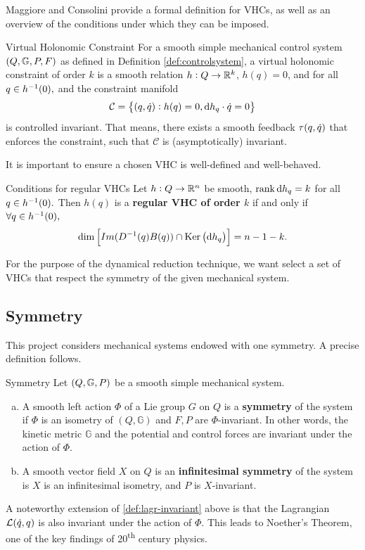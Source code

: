 \documentclass[main.tex]{subfiles}
\begin{document}
Maggiore and Consolini provide a formal definition for VHCs, as well as an overview of the conditions under which they can be imposed\cite{maggiore2012virtual}.

\begin{boxdef}{Virtual Holonomic Constraint \cite{maggiore2012virtual}}
For a smooth simple mechanical control system $\del{Q,\mbbg,P,F}$ as defined in Definition \ref{def:controlsystem}, a virtual holonomic constraint of order $k$ is a smooth relation $h:Q\to\mathbb{R}^k$,
$h(q)={0}$, and for all $q\in h^{-1}(0),$ and the constraint manifold
\begin{align}
    \mathcal{C}=\cbr{(q,\qd):h(q)=0,\dd h_q\cdot\qd=0}
\end{align}
is controlled invariant. That means, there exists a smooth feedback $\tau(q,\dot q)$ that enforces the constraint, such that $\mathcal{C}$ is (asymptotically) invariant.
\end{boxdef}
It is important to ensure a chosen VHC is well-defined and well-behaved.
\begin{boxthm}{Conditions for regular VHCs \cite{maggiore2012virtual}}
Let $h:Q\to\mathbb{R}^n$ be smooth, $\rank \dd h_q=k$ for all $q\in h^{-1}(0).$ Then $h(q)$ is a \textbf{regular VHC of order $k$} if and only if $\forall q\in h^{-1}(0),$
\begin{align}
     \dim\sbr{Im(D\inv(q)B(q))\cap \Ker{\dhq}}=n-1-k.
\end{align}
\end{boxthm}\label{thm:regularvhc}
For the purpose of the dynamical reduction technique, we want select a set of VHCs that respect the symmetry of the given mechanical system. 

\subsection{Symmetry}
This project considers mechanical systems endowed with one symmetry. A precise definition follows.
\begin{boxdef}{Symmetry 
\cite{bullo2019geometric}%
}
Let $\del{Q,\mbbg,P}$ be a smooth simple mechanical system. \begin{enumerate}[(a)]
    \item\label{def:lagr-invariant} A smooth left action $\Phi$ of a Lie group $G$ on $Q$ is a \textbf{symmetry} of the system if $\Phi$ is an isometry of $(Q,\mathbb{G})$ and $F,P$ are $\Phi$-invariant. In other words, the kinetic metric $\mathbb{G}$ and the potential and control forces are invariant under the action of $\Phi$.
    \item A smooth vector field $X$ on $Q$ is an \textbf{infinitesimal symmetry} of the system is $X$ is an infinitesimal isometry, and $P$ is $X$-invariant.
\end{enumerate}
\end{boxdef}\label{def:symmetry}
A noteworthy extension of \ref{def:lagr-invariant} above is that the Lagrangian $\mathcal{L}(\dot q,q)$ is also invariant under the action of $\Phi$. This leads to Noether's Theorem, one of the key findings of 20\textsuperscript{th} century physics.
\end{document}
